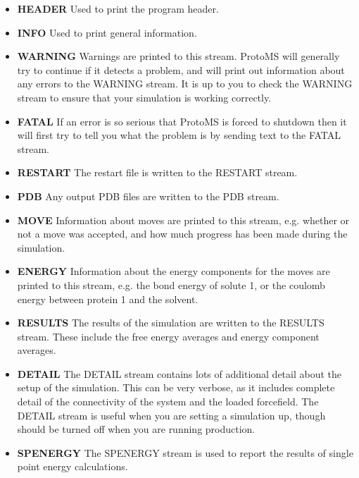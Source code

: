 \documentclass[letterpaper,10pt,english]{sphinxmanual}
\begin{document}
\begin{itemize}
\item {} 
\textbf{HEADER} Used to print the program header.

\item {} 
\textbf{INFO} Used to print general information.

\item {} 
\textbf{WARNING} Warnings are printed to this stream. ProtoMS will generally try to continue if it detects a problem, and will print out information about any errors to the WARNING stream. It is up to you to check the WARNING stream to ensure that your simulation is working correctly.

\item {} 
\textbf{FATAL} If an error is so serious that ProtoMS is forced to shutdown then it will first try to tell you what the problem is by sending text to the FATAL stream.

\item {} 
\textbf{RESTART} The restart file is written to the RESTART stream.

\item {} 
\textbf{PDB} Any output PDB files are written to the PDB stream.

\item {} 
\textbf{MOVE} Information about moves are printed to this stream, e.g. whether or not a move was accepted, and how much progress has been made during the simulation.

\item {} 
\textbf{ENERGY} Information about the energy components for the moves are printed to this stream, e.g. the bond energy of solute 1, or the coulomb energy between protein 1 and the solvent.

\item {} 
\textbf{RESULTS} The results of the simulation are written to the RESULTS stream. These include the free energy averages and energy component averages.

\item {} 
\textbf{DETAIL} The DETAIL stream contains lots of additional detail about the setup of the simulation. This can be very verbose, as it includes complete detail of the connectivity of the system and the loaded forcefield. The DETAIL stream is useful when you are setting a simulation up, though should be turned off when you are running production.

\item {} 
\textbf{SPENERGY} The SPENERGY stream is used to report the results of single point energy calculations.


\end{itemize}
\end{document}
